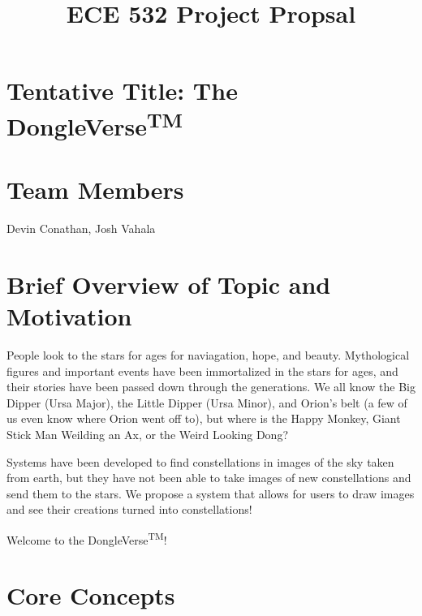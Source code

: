 \documentclass{article}
\title{ECE 532 Project Propsal}
\date{}
\author{}
\begin{document}
\maketitle

\section{Tentative Title: The DongleVerse\textsuperscript{TM\textregistered}}

\section{Team Members}
Devin Conathan, Josh Vahala

\section{Brief Overview of Topic and Motivation}
People look to the stars for ages for naviagation, hope, and beauty. Mythological figures and important events have been immortalized in the stars for ages, and their stories have been passed down through the generations. We all know the Big Dipper (Ursa Major), the Little Dipper (Ursa Minor), and Orion's belt (a few of us even know where Orion went off to), but where is the Happy Monkey, Giant Stick Man Weilding an Ax, or the Weird Looking Dong? \par
Systems have been developed to find constellations in images of the sky taken from earth, but they have not been able to take images of new constellations and send them to the stars. We propose a system that allows for users to draw images and see their creations turned into constellations! \par
Welcome to the DongleVerse\textsuperscript{TM\textregistered}! 

\section{Core Concepts}
\end{document}
